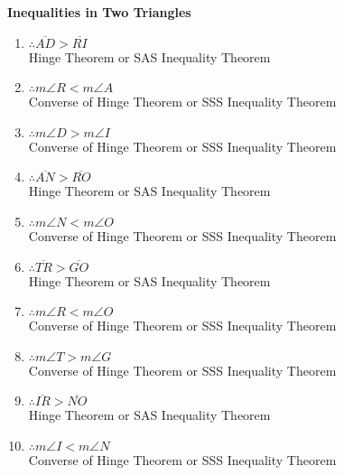 \begin{center}
\textbf{Inequalities in Two Triangles}\\
\end{center}

\vspace*{1ex}

{\begin{enumerate}[label = \arabic*. ]
\item $\therefore \overline{AD}  > \overline{RI}$ \redcheck \\
Hinge Theorem or SAS Inequality Theorem \redcheck  

\item $\therefore m\angle{R} < m\angle{A}$ \redcheck \\
Converse of Hinge Theorem or SSS Inequality Theorem \redcheck 

\item $\therefore m\angle{D}> m\angle{I}$ \redcheck \\
Converse of Hinge Theorem or SSS Inequality Theorem \redcheck 

\item $\therefore \overline{AN} > \overline{RO}$ \redcheck \\
Hinge Theorem or SAS Inequality Theorem \redcheck 

\item $\therefore m\angle{N}< m\angle{O}$ \redcheck \\
Converse of Hinge Theorem or SSS Inequality Theorem \redcheck 

\item $\therefore \overline{TR} > \overline{GO}$ \redcheck \\
Hinge Theorem or SAS Inequality Theorem \redcheck 

\item $\therefore m\angle{R}< m\angle{O}$ \redcheck \\
Converse of Hinge Theorem or SSS Inequality Theorem \redcheck 

\item $\therefore m\angle{T}> m\angle{G}$ \redcheck \\
Converse of Hinge Theorem or SSS Inequality Theorem \redcheck 

\item $\therefore \overline{IR} > \overline{NO}$ \redcheck \\
Hinge Theorem or SAS Inequality Theorem \redcheck 

\item $\therefore m\angle{I} <m\angle{N}$ \redcheck \\
Converse of Hinge Theorem or SSS Inequality Theorem \redcheck 

\end{enumerate}}





     